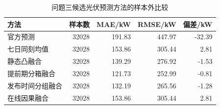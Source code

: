 \begin{table}[H]
\centering
\small
\caption{问题三候选光伏预测方法的样本外比较}
\label{tab:q3-method-comparison}
\begin{tabular}{lrrrr}
\toprule
方法 & 样本数 & MAE/kW & RMSE/kW & 偏差/kW \\
\midrule
官方预测 & 32028 & 191.83 & 447.97 & -32.39 \\
七日同刻均值 & 32028 & 153.86 & 305.44 & 2.81 \\
静态凸融合 & 32028 & 139.29 & 276.92 & -1.53 \\
提前期分箱融合 & 32028 & 121.73 & 252.99 & -0.81 \\
发布时间分组融合 & 32028 & 132.19 & 265.56 & -1.28 \\
在线因果融合 & 32028 & 153.86 & 305.44 & 2.81 \\
\bottomrule
\end{tabular}
\end{table}

